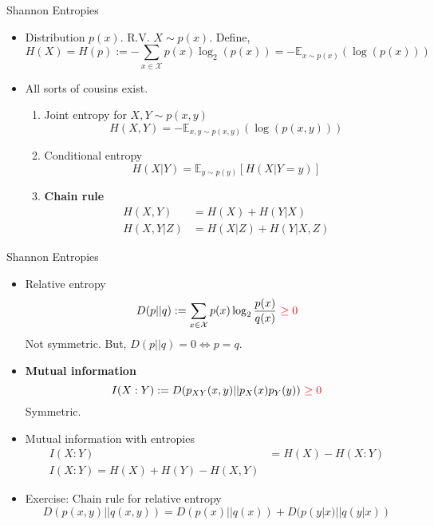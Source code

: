 \documentclass[handout]{beamer}
\begin{document}
\begin{frame}{Shannon Entropies}
    \begin{itemize}
        \item Distribution $p(x)$. R.V. $X\sim p(x)$. Define,
        \begin{equation}
           H(X) =  H(p) := -\sum_{x\in\mathcal{X}}p(x)\log_2(p(x)) = -\mathbb{E}_{x\sim p(x)}(\log(p(x)))
        \end{equation}\pause 
        \item All sorts of cousins exist.\pause 
        \begin{enumerate}
            \item Joint entropy for $X,Y \sim p(x,y)$
            \begin{equation}
                H(X,Y) = -\mathbb{E}_{x,y\sim p(x,y)}(\log(p(x,y)))
            \end{equation}\pause 
            \item Conditional entropy  
            \begin{equation}
                H(X|Y) = \mathbb{E}_{y\sim p(y)}[H(X|Y=y)]
            \end{equation}\pause 
        \item \textbf{Chain rule}
        \begin{align}
            H(X,Y) &= H(X) + H(Y|X) \\ 
            H(X,Y|Z) &= H(X|Z) + H(Y|X,Z)
        \end{align}

        \end{enumerate}
    \end{itemize}
\end{frame}
\begin{frame}{Shannon Entropies}
    \begin{itemize}
        \item Relative entropy
        \begin{equation}
            D(p||q) := \sum_{x\in\mathcal{X}}p(x) \log_2\frac{p(x)}{q(x)} \textcolor{red}{~\geq 0}
        \end{equation}\pause 
        Not symmetric. But, $D(p||q) = 0 \Leftrightarrow p = q$. \pause 
        \item \textbf{Mutual information}
        \begin{equation}
            I(X:Y) := D(p_{XY}(x,y)||p_X(x)p_Y(y)) \textcolor{red}{~\geq 0}
        \end{equation}\pause 
        Symmetric.\pause 
        \item Mutual information with entropies
        \begin{align}
            I(X:Y) &= H(X) - H(X:Y) \\ 
            I(X:Y) = H(X) + H(Y) - H(X,Y)
        \end{align}\pause 
        \item Exercise: Chain rule for relative entropy
        \begin{equation}
            D(p(x,y)||q(x,y)) = D(p(x)||q(x)) + D(p(y|x)||q(y|x))
        \end{equation}
    \end{itemize}
\end{frame}
\end{document}
